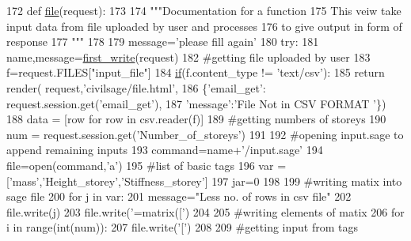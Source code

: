 \begin{DoxyCode}
172 \textcolor{keyword}{def }\hyperlink{namespacecivilsage_1_1views_a32de127956738677913352a2db84ecdb}{file}(request):
173 
174     \textcolor{stringliteral}{"""Documentation for a function}
175 \textcolor{stringliteral}{    This veiw take input data from file uploaded by user and processes}
176 \textcolor{stringliteral}{    to give output in form of response}
177 \textcolor{stringliteral}{    """}
178 
179     message=\textcolor{stringliteral}{'please fill again'}
180     \textcolor{keywordflow}{try}:
181         name,message=\hyperlink{namespacecivilsage_1_1views_ad9397359f36a9df37e0aa43f3be032a3}{first\_write}(request)
182         \textcolor{comment}{#getting file uploaded by user}
183         f=request.FILES[\textcolor{stringliteral}{"input\_file"}]
184         \hyperlink{bootstrap_8min_8js_ac2d69f5011896c6ed4a54e0dd36f6334}{if}(f.content\_type != \textcolor{stringliteral}{'text/csv'}):
185             \textcolor{keywordflow}{return} render( request,\textcolor{stringliteral}{'civilsage/file.html'},
186             \{\textcolor{stringliteral}{'email\_get'}: request.session.get(\textcolor{stringliteral}{'email\_get'}),
187             \textcolor{stringliteral}{'message'}:\textcolor{stringliteral}{'File Not in CSV FORMAT '}\})
188         data = [row \textcolor{keywordflow}{for} row \textcolor{keywordflow}{in} csv.reader(f)]
189         \textcolor{comment}{#getting numbers of storeys}
190         num = request.session.get(\textcolor{stringliteral}{'Number\_of\_storeys'})
191 
192         \textcolor{comment}{#opening input.sage to append remaining inputs}
193         command=name+\textcolor{stringliteral}{'/input.sage'}
194         file=open(command,\textcolor{stringliteral}{'a'})
195         \textcolor{comment}{#list of basic tags}
196         var = [\textcolor{stringliteral}{'mass'},\textcolor{stringliteral}{'Height\_storey'},\textcolor{stringliteral}{'Stiffness\_storey'}]
197         jar=0
198 
199         \textcolor{comment}{#writing matix into sage file}
200         \textcolor{keywordflow}{for} j \textcolor{keywordflow}{in} var:
201             message=\textcolor{stringliteral}{"Less no. of rows in csv file"}
202             file.write(j)
203             file.write(\textcolor{stringliteral}{'=matrix(['})
204 
205             \textcolor{comment}{#writing elements of matix}
206             \textcolor{keywordflow}{for} i \textcolor{keywordflow}{in} range(int(num)):
207                 file.write(\textcolor{stringliteral}{'['})
208 
209                 \textcolor{comment}{#getting input from tags}

\end{DoxyCode}

